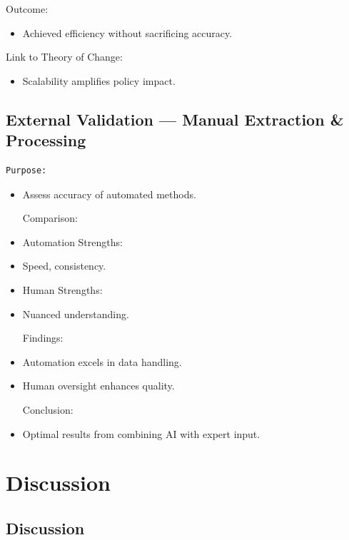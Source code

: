\documentclass[
  letterpaper,
]{book}
\providecommand{\tightlist}{%
  \setlength{\itemsep}{0pt}\setlength{\parskip}{0pt}}
\begin{document}
Outcome:

\begin{itemize}
\tightlist
\item
  Achieved efficiency without sacrificing accuracy.
\end{itemize}

Link to Theory of Change:

\begin{itemize}
\tightlist
\item
  Scalability amplifies policy impact.
\end{itemize}

\section{External Validation --- Manual Extraction \&
Processing}\label{external-validation-manual-extraction-processing}

\begin{verbatim}
Purpose:
\end{verbatim}

\begin{itemize}
\item
  Assess accuracy of automated methods.

  Comparison:
\item
  Automation Strengths:\\
\item
  Speed, consistency.\\
\item
  Human Strengths:\\
\item
  Nuanced understanding.

  Findings:
\item
  Automation excels in data handling.\\
\item
  Human oversight enhances quality.

  Conclusion:
\item
  Optimal results from combining AI with expert input.
\end{itemize}


\chapter{Discussion}\label{discussion}

\section{Discussion}\label{discussion-1}
\end{document}
